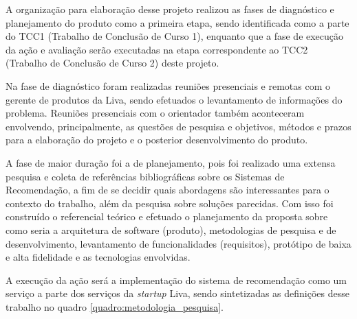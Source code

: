 A organização para elaboração desse projeto realizou as fases de diagnóstico e planejamento do produto como a primeira etapa, sendo identificada como a parte do TCC1 (Trabalho de Conclusão de Curso 1), enquanto que a fase de execução da ação e avaliação serão executadas na etapa correspondente ao TCC2 (Trabalho de Conclusão de Curso 2) deste projeto.

Na fase de diagnóstico foram realizadas reuniões presenciais e remotas com o gerente de produtos da Liva, sendo efetuados o levantamento de informações do problema. Reuniões presenciais com o orientador também aconteceram envolvendo, principalmente, as questões de pesquisa e objetivos, métodos e prazos para a elaboração do projeto e o posterior desenvolvimento do produto.

A fase de maior duração foi a de planejamento, pois foi realizado uma extensa pesquisa e coleta de referências bibliográficas sobre os Sistemas de Recomendação, a fim de se decidir quais abordagens são interessantes para o contexto do trabalho, além da pesquisa sobre soluções parecidas. Com isso foi construído o referencial teórico e efetuado o planejamento da proposta sobre como seria a arquitetura de software (produto), metodologias de pesquisa e de desenvolvimento, levantamento de funcionalidades (requisitos), protótipo de baixa e alta fidelidade e as tecnologias envolvidas.

A execução da ação será a implementação do sistema de recomendação como um serviço a parte dos serviços da \textit{startup} Liva, sendo sintetizadas as definições desse trabalho no quadro \ref{quadro:metodologia_pesquisa}.

